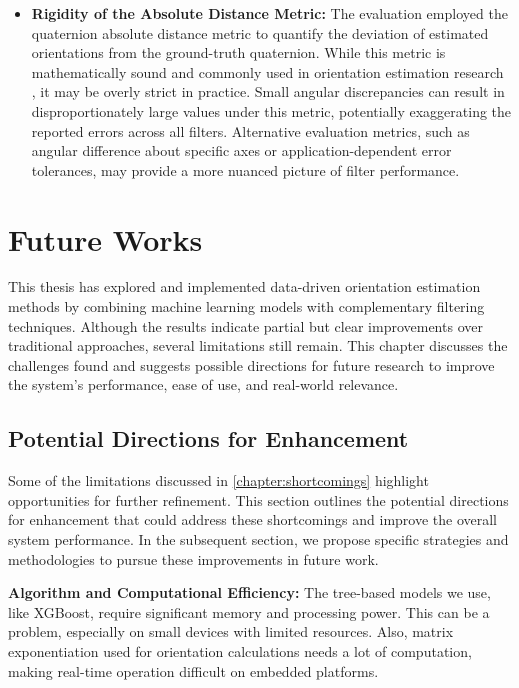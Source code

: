 \documentclass{iutbscthesis}
\begin{document}
\begin{itemize}
    \item \textbf{Rigidity of the Absolute Distance Metric:} The evaluation employed the quaternion absolute distance metric to quantify the deviation of estimated orientations from the ground-truth quaternion. While this metric is mathematically sound and commonly used in orientation estimation research \cite{markley2007quaternion}, it may be overly strict in practice. Small angular discrepancies can result in disproportionately large values under this metric, potentially exaggerating the reported errors across all filters. Alternative evaluation metrics, such as angular difference about specific axes or application-dependent error tolerances, may provide a more nuanced picture of filter performance.
\end{itemize}





\chapter{Future Works} \label{chapter:futureWorks}

This thesis has explored and implemented data-driven orientation estimation methods by combining machine learning models with complementary filtering techniques. Although the results indicate partial but clear improvements over traditional approaches, several limitations still remain. This chapter discusses the challenges found and suggests possible directions for future research to improve the system’s performance, ease of use, and real-world relevance.

\section{Potential Directions for Enhancement}

Some of the limitations discussed in \autoref{chapter:shortcomings} highlight opportunities for further refinement. This section outlines the potential directions for enhancement that could address these shortcomings and improve the overall system performance. In the subsequent section, we propose specific strategies and methodologies to pursue these improvements in future work.

\textbf{Algorithm and Computational Efficiency:}  
The tree-based models we use, like XGBoost, require significant memory and processing power. This can be a problem, especially on small devices with limited resources. Also, matrix exponentiation used for orientation calculations needs a lot of computation, making real-time operation difficult on embedded platforms.
\end{document}
